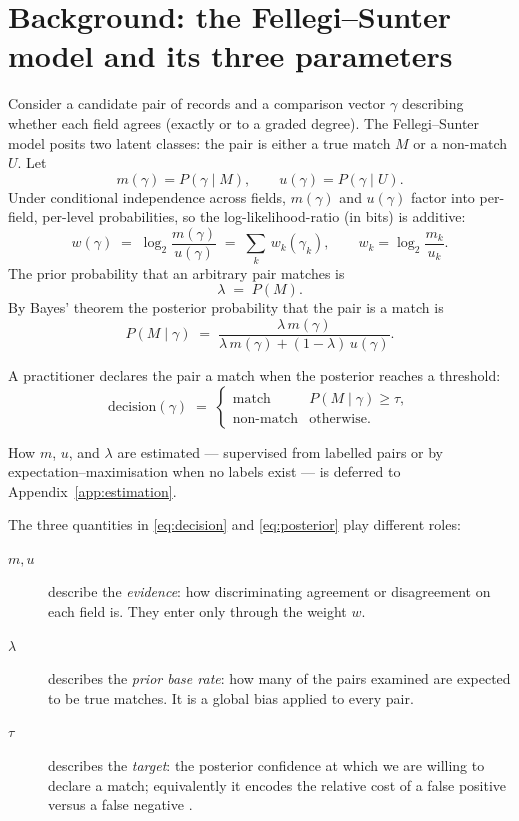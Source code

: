 \documentclass[11pt]{article}
\begin{document}
\section{Background: the Fellegi--Sunter model and its three parameters}
\label{sec:fs}
Consider a candidate pair of records and a comparison vector $\gamma$ describing whether
each field agrees (exactly or to a graded degree). The Fellegi--Sunter model
\cite{fellegi1969} posits two latent classes: the pair is either a true match $M$ or a
non-match $U$. Let
\begin{equation}
m(\gamma)=P(\gamma\mid M),\qquad u(\gamma)=P(\gamma\mid U).
\end{equation}
Under conditional independence across fields, $m(\gamma)$ and $u(\gamma)$ factor into
per-field, per-level probabilities, so the log-likelihood-ratio (in bits) is additive:
\begin{equation}
w(\gamma)\;=\;\log_2\frac{m(\gamma)}{u(\gamma)}\;=\;\sum_k\,w_k(\gamma_k),
\qquad w_k=\log_2\frac{m_k}{u_k}.
\end{equation}
The prior probability that an arbitrary pair matches is
\begin{equation}
\lambda\;=\;P(M).
\end{equation}
By Bayes' theorem the posterior probability that the pair is a match is
\begin{equation}
P(M\mid\gamma)\;=\;\frac{\lambda\,m(\gamma)}
{\lambda\,m(\gamma)+(1-\lambda)\,u(\gamma)}.
\label{eq:posterior}
\end{equation}

A practitioner declares the pair a match when the posterior reaches a threshold:
\begin{equation}
\text{decision}(\gamma)\;=\;\begin{cases}\text{match} & P(M\mid\gamma)\ge \tau,\\
\text{non-match} & \text{otherwise.}\end{cases}
\label{eq:decision}
\end{equation}

How $m$, $u$, and $\lambda$ are estimated --- supervised from labelled pairs or by
expectation--maximisation when no labels exist --- is deferred to Appendix~\ref{app:estimation}.

The three quantities in \eqref{eq:decision} and \eqref{eq:posterior} play different roles:
\begin{description}
\item[$m,u$] describe the \emph{evidence}: how discriminating agreement or disagreement on
each field is. They enter only through the weight $w$.
\item[$\lambda$] describes the \emph{prior base rate}: how many of the pairs examined are
expected to be true matches. It is a global bias applied to every pair.
\item[$\tau$] describes the \emph{target}: the posterior confidence at which we are willing
to declare a match; equivalently it encodes the relative cost of a false positive versus a
false negative \cite{winkler1993}.
\end{description}
\end{document}
